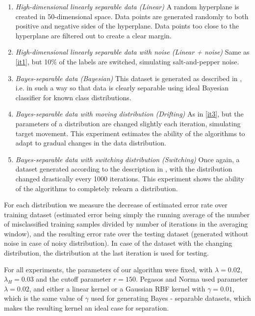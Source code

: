 \begin{enumerate}
  \item \emph{High-dimensional linearly separable data (Linear)} \label{it1} A random hyperplane is created in 50-dimensional space. Data points are generated randomly to both positive and negative sides of the hyperplane. Data points too close to the hyperplane are filtered out to create a clear margin. 
  \item \emph{High-dimensional linearly separable data with noise (Linear + noise)} Same as \ref{it1}, but 10\% of the labels are switched, simulating salt-and-pepper noise.
  \item \emph{Bayes-separable data (Bayesian)} \label{it3} This dataset is generated as described in \cite{Norma}, i.e. in such a way so that data is clearly separable using ideal Bayesian classifier for known class distributions.
  \item \emph{Bayes-separable data with moving distribution (Drifting)} As in \ref{it3}, but the parameters of a distribution are changed slightly each iteration, simulating target movement. This experiment estimates  the ability of the algorithms to adapt to gradual changes in the data distribution.
  \item \emph{Bayes-separable data with switching distribution (Switching)} Once again, a dataset generated according to the description in \cite{Norma}, with the distribution changed drastically every 1000 iterations. This experiment shows the ability of the algorithms to completely relearn a distribution. 
\end{enumerate}

For each distribution we measure the decrease of estimated error rate over training dataset (estimated error being simply the running average of the number of misclassified training samples divided by number of iterations in the averaging window), and the resulting error rate over the testing dataset (generated without noise in case of noisy distribution). In case of the dataset with the changing distribution, the distribution at the last iteration is used for testing.

For all experiments, the parameters of our algorithm were fixed, with $\lambda=0.02$, $\lambda_H=0.03$ and the cutoff parameter $r=150$. Pegasos and Norma used parameter $\lambda=0.02$, and either a linear kernel or a Gaussian RBF kernel with $\gamma=0.01$, which is the same value of $\gamma$ used for generating Bayes - separable datasets, which makes the resulting kernel an ideal case for separation.
